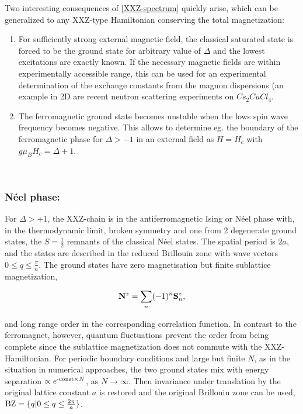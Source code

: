 \documentclass{homework}
\begin{document}

\begin{tcolorbox}[colback =yellow, title = Physical Context]

Two interesting consequences of \cref{XXZ-spectrum} quickly arise, which can be generalized to any XXZ-type Hamiltonian conserving the total magnetization: 

\begin{enumerate}
    \item For sufficiently strong external magnetic field, the classical saturated state is forced to be the ground state for arbitrary value of $\Delta$ and the lowest excitations are exactly known. If the necessary magnetic fields are within experimentally accessible range, this can be used for an experimental determination of the exchange constants from the magnon dispersions (an example in 2D are recent neutron scattering experiments on $Cs_2 Cu Cl_4$. \\
    \item The ferromagnetic ground state becomes unstable when the lows spin wave frequency becomes negative. This allows to determine eg. the boundary of the ferromagnetic phase for $\Delta > -1$ in an external field as $H = H_c$ with $g \mu_B H_c = \Delta + 1$. 
\end{enumerate}


\end{tcolorbox}

\blanky \\

\subsubsection{\textbf{Néel phase:}}

For $\Delta > +1$, the XXZ-chain is in the antiferromagnetic Ising or Néel phase with, in the thermodynamic limit, broken symmetry and one from 2 degenerate ground states, the $S=\frac{1}{2}$ remnants of the classical Néel states. The spatial period is $2a$, and the states are described in the reduced Brillouin zone with wave vectors $0 \leq q \leq \frac{\pi}{a}$. The ground states have zero magnetisation but finite sublattice magnetization, 

$$
{\bf N}^z = \sum_{n} (-1)^n {\bf S}_n^z,
$$

and long range order in the corresponding correlation function. In contrast to the ferromagnet, however, quantum fluctuations prevent the order from being complete since the sublattice magnetization does not commute with the XXZ-Hamiltonian. For periodic boundary conditions and large but finite $N$, as in the situation in numerical approaches, the two ground states mix with energy separation $\propto e^{\textnormal{-const}\times N}$, as $N \rightarrow \infty$. Then invariance under translation by the original lattice constant $a$ is restored and the original Brillouin zone can be used, $\textnormal{BZ} = \{q | 0 \leq q \leq \frac{2\pi}{a}\}$. \\
\end{document}
